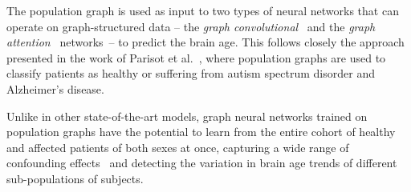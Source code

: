 The population graph is used as input to two types of neural networks that can operate on graph-structured data – the \textit{graph convolutional}~\cite{kipf2017semi} and the \textit{graph attention}~\cite{velickovic2018graph} networks~– to predict the brain age. This follows closely the approach presented in the work of Parisot et al.~\cite{parisot2017spectral,parisot2018disease}, where population graphs are used to classify patients as healthy or suffering from autism spectrum disorder and Alzheimer's disease.


Unlike in other state-of-the-art models, graph neural networks trained on population graphs have the potential to learn from the entire cohort of healthy and affected patients of both sexes at once, capturing a wide range of confounding effects~\cite{ruigrok2014meta} and detecting the variation in brain age trends of different sub-populations of subjects. 




